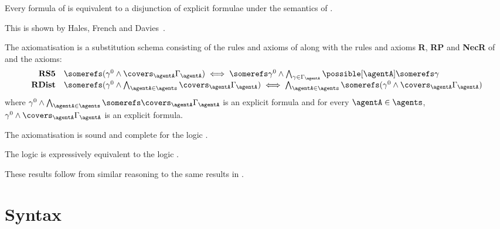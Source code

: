 \documentclass[twoside]{aiml14}
\begin{document}
  \begin{proposition}
      Every formula of \lang{} is equivalent to a disjunction of explicit
      formulae under the semantics of \logicS{}.
  \end{proposition}

  This is shown by Hales, French and Davies~\cite{hales2012}.

  \begin{definition}
      The axiomatisation \axiomAmlS{} is a substitution schema consisting of
      the rules and axioms of \axiomAmlS{} along with the rules and axioms
      {\bf R}, {\bf RP} and {\bf NecR} of \axiomAamlK{} and the axioms:
      $$
      \begin{array}{rl}
          {\bf RS5}  & \somerefs (\gamma^0 \land \covers_\agentA \Gamma_\agentA) \iff \somerefs \gamma^0 \land \bigwedge_{\gamma \in \Gamma_\agentA} \possible[\agentA] \somerefs \gamma\\
          {\bf RDist}  & \somerefs (\gamma^0 \land \bigwedge_{\agentA \in \agents} \covers_\agentA \Gamma_\agentA) \iff \bigwedge_{\agentA \in \agents} \somerefs (\gamma^0 \land \covers_\agentA \Gamma_\agentA)
      \end{array}
      $$
      where $\gamma^0 \land \bigwedge_{\agentA \in \agents} \somerefs \covers_\agentA \Gamma_\agentA$ is an explicit formula
      and for every $\agentA \in \agents$, $\gamma^0 \land \covers_\agentA \Gamma_\agentA$ is an explicit formula.
  \end{definition}

  \begin{proposition}
      The axiomatisation \axiomAamlS{} is sound and complete for the logic \logicAamlS{}.
  \end{proposition}

  \begin{proposition}
      The logic \logicAamlS{} is expressively equivalent to the logic \logicS{}.
  \end{proposition}

  These results follow from similar reasoning to the same results in \logicAamlK{}.

  \section{Syntax}\label{syntax}
\end{document}
